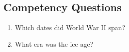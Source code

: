 \subsection{Competency Questions}
\label{cqs:Temporal}
\begin{enumerate}[CQ1.]
\item Which dates did World War II span?
\item What era was the ice age?
\end{enumerate}

\newpage
